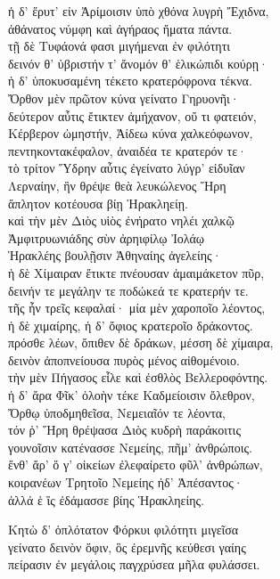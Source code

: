 \quad{}ἡ δ' ἔρυτ' εἰν Ἀρίμοισιν ὑπὸ χθόνα λυγρὴ Ἔχιδνα, \\
ἀθάνατος νύμφη καὶ ἀγήραος ἤματα πάντα. \\
τῇ δὲ Τυφάονά φασι μιγήμεναι ἐν φιλότητι\\
δεινόν θ' ὑβριστήν τ' ἄνομόν θ' ἑλικώπιδι κούρῃ· \\
ἡ δ' ὑποκυσαμένη τέκετο κρατερόφρονα τέκνα.\\
Ὄρθον μὲν πρῶτον κύνα γείνατο Γηρυονῆι· \\
δεύτερον αὖτις ἔτικτεν ἀμήχανον, οὔ τι φατειόν,  \\
Κέρβερον ὠμηστήν, Ἀίδεω κύνα χαλκεόφωνον,\\
πεντηκοντακέφαλον, ἀναιδέα τε κρατερόν τε· \\
τὸ τρίτον Ὕδρην αὖτις ἐγείνατο λύγρ' εἰδυῖαν \\
Λερναίην, ἣν θρέψε θεὰ λευκώλενος Ἥρη\\
ἄπλητον κοτέουσα βίῃ Ἡρακληείῃ. \\
καὶ τὴν μὲν Διὸς υἱὸς ἐνήρατο νηλέι χαλκῷ\\
Ἀμφιτρυωνιάδης σὺν ἀρηιφίλῳ Ἰολάῳ\\
Ἡρακλέης βουλῇσιν Ἀθηναίης ἀγελείης·\\
ἡ δὲ Χίμαιραν ἔτικτε πνέουσαν ἀμαιμάκετον πῦρ,\\
δεινήν τε μεγάλην τε ποδώκεά τε κρατερήν τε.  \\
τῆς ἦν τρεῖς κεφαλαί· μία μὲν χαροποῖο λέοντος,\\
ἡ δὲ χιμαίρης, ἡ δ' ὄφιος κρατεροῖο δράκοντος.\\
πρόσθε λέων, ὄπιθεν δὲ δράκων, μέσση δὲ χίμαιρα,\\
δεινὸν ἀποπνείουσα πυρὸς μένος αἰθομένοιο.\\
τὴν μὲν Πήγασος εἷλε καὶ ἐσθλὸς Βελλεροφόντης. \\
ἡ δ' ἄρα Φῖκ' ὀλοὴν τέκε Καδμείοισιν ὄλεθρον,\\
Ὄρθῳ ὑποδμηθεῖσα, Νεμειαῖόν τε λέοντα, \\
τόν ῥ' Ἥρη θρέψασα Διὸς κυδρὴ παράκοιτις\\
γουνοῖσιν κατένασσε Νεμείης, πῆμ' ἀνθρώποις.\\
ἔνθ' ἄρ' ὅ γ' οἰκείων ἐλεφαίρετο φῦλ' ἀνθρώπων, \\
κοιρανέων Τρητοῖο Νεμείης ἠδ' Ἀπέσαντος· \\
ἀλλά ἑ ἲς ἐδάμασσε βίης Ἡρακληείης.

\quad{}Κητὼ δ' ὁπλότατον Φόρκυι φιλότητι μιγεῖσα\\
γείνατο δεινὸν ὄφιν, ὃς ἐρεμνῆς κεύθεσι γαίης\\
πείρασιν ἐν μεγάλοις παγχρύσεα μῆλα φυλάσσει. 

